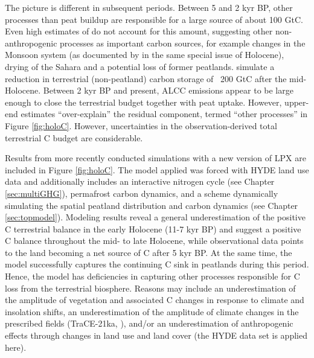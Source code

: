 
The picture is different in subsequent periods. Between 5 and 2 kyr BP, other processes than peat buildup are responsible for a large source of about 100 GtC. Even high estimates of \citet{kaplan09} do not account for this amount, suggesting other non-anthropogenic processes as important carbon sources, for example changes in the Monsoon system (as documented by \citet{burns11} in the same special issue of Holocene), drying of the Sahara \citep{indermuehle99nat} and a potential loss of former peatlands. \citet{schurgers06cp} simulate a reduction in terrestrial (non-peatland) carbon storage of ~200 GtC after the mid-Holocene. Between 2 kyr BP and present, ALCC emissions appear to be large enough to close the terrestrial budget together with peat uptake. However, upper-end estimates ``over-explain'' the residual component, termed ``other processes'' in Figure \ref{fig:holoC}. However, uncertainties in the observation-derived total terrestrial C budget are considerable.

Results from more recently conducted simulations with a new version of LPX are included in Figure \ref{fig:holoC}. The model applied was forced with HYDE land use data \citep{kleingoldewijk2011geb} and additionally includes an interactive nitrogen cycle (see Chapter \ref{sec:multiGHG}), permafrost carbon dynamics, and a scheme dynamically simulating the spatial peatland distribution and carbon dynamics (see Chapter \ref{sec:topmodel}). Modeling results reveal a general underestimation of the positive C terrestrial balance in the early Holocene (11-7 kyr BP) and suggest a positive C balance throughout the mid- to late Holocene, while observational data points to the land becoming a net source of C after 5 kyr BP. At the same time, the model successfully captures the continuing C sink in peatlands during this period. Hence, the model has deficiencies in capturing other processes responsible for C loss from the terrestrial biosphere. Reasons may include an underestimation of the amplitude of vegetation and associated C changes in response to climate and insolation shifts, an underestimation of the amplitude of climate changes in the prescribed fields (TraCE-21ka, \citet{liu09}), and/or an underestimation of anthropogenic effects through changes in land use and land cover (the HYDE data set \citep{kleingoldewijk2011geb} is applied here). 


